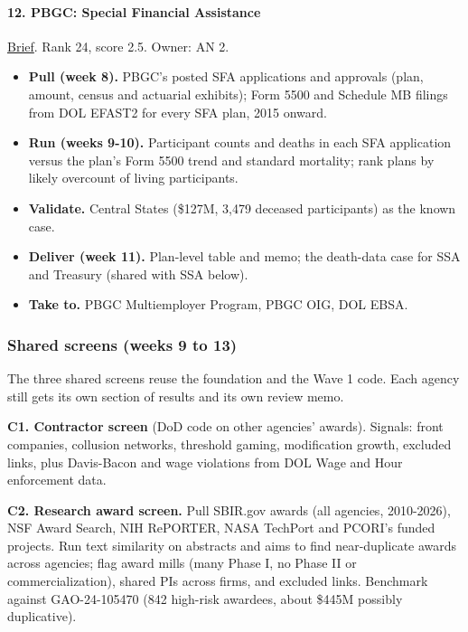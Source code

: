 \documentclass[letterpaper,11pt]{article}
\providecommand{\tightlist}{\setlength{\itemsep}{0pt}\setlength{\parskip}{0pt}}
\begin{document}
\hypertarget{pbgc-special-financial-assistance}{%
\paragraph{12. PBGC: Special Financial
Assistance}\label{pbgc-special-financial-assistance}}

\href{agencies/pbgc.pdf}{Brief}. Rank 24, score 2.5. Owner: AN 2.

\begin{itemize}
\tightlist
\item
  \textbf{Pull (week 8).} PBGC's posted SFA applications and approvals
  (plan, amount, census and actuarial exhibits); Form 5500 and Schedule
  MB filings from DOL EFAST2 for every SFA plan, 2015 onward.
\item
  \textbf{Run (weeks 9-10).} Participant counts and deaths in each SFA
  application versus the plan's Form 5500 trend and standard mortality;
  rank plans by likely overcount of living participants.
\item
  \textbf{Validate.} Central States (\$127M, 3,479 deceased
  participants) as the known case.
\item
  \textbf{Deliver (week 11).} Plan-level table and memo; the death-data
  case for SSA and Treasury (shared with SSA below).
\item
  \textbf{Take to.} PBGC Multiemployer Program, PBGC OIG, DOL EBSA.
\end{itemize}

\hypertarget{shared-screens-weeks-9-to-13}{%
\subsubsection{Shared screens (weeks 9 to
13)}\label{shared-screens-weeks-9-to-13}}

The three shared screens reuse the foundation and the Wave 1 code. Each
agency still gets its own section of results and its own review memo.

\textbf{C1. Contractor screen} (DoD code on other agencies' awards).
Signals: front companies, collusion networks, threshold gaming,
modification growth, excluded links, plus Davis-Bacon and wage
violations from DOL Wage and Hour enforcement data.

\textbf{C2. Research award screen.} Pull SBIR.gov awards (all agencies,
2010-2026), NSF Award Search, NIH RePORTER, NASA TechPort and PCORI's
funded projects. Run text similarity on abstracts and aims to find
near-duplicate awards across agencies; flag award mills (many Phase I,
no Phase II or commercialization), shared PIs across firms, and excluded
links. Benchmark against GAO-24-105470 (842 high-risk awardees, about
\$445M possibly duplicative).
\end{document}

